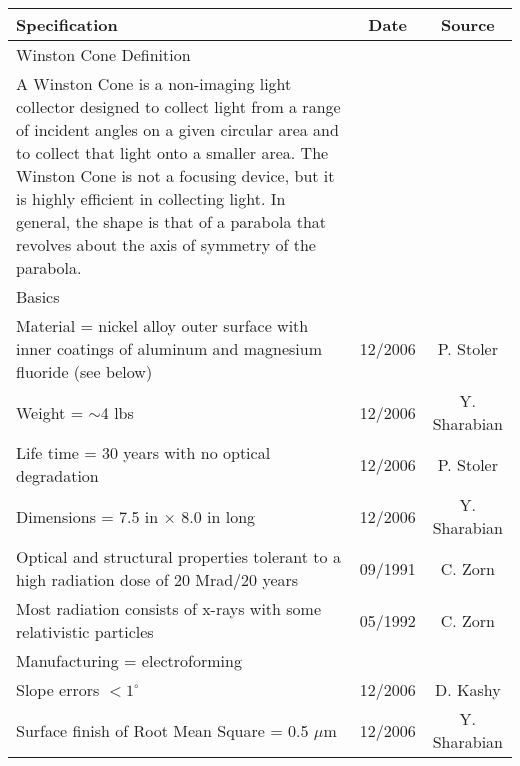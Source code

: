 \begin{table}
\begin{center}
\begin{tabular}{|l|c|c|} \hline
Specification             & Date              & Source    \\ \hline
Winston Cone Definition   &                   &           \\ \hline
\begin{minipage}[l]{0.68\textwidth} A Winston Cone is a non-imaging 
light collector designed to collect light from a range of incident 
angles on a given circular area and to collect that light onto a 
smaller area.  The Winston Cone is not a focusing device, but it is 
highly efficient in collecting light.  In general, the shape is 
that of a parabola that revolves about the axis of symmetry of the 
parabola.\end{minipage}   &                   &           \\ \hline
Basics                    &                   &           \\ \hline
\begin{minipage}[l]{0.68\textwidth}
Material = nickel alloy outer surface with inner coatings of aluminum and magnesium fluoride (see below)
\end{minipage}            & 12/2006           & P. Stoler \\ \hline
Weight = $\sim$4 lbs      & 12/2006           & Y. Sharabian \\ \hline
Life time = 30 years with no optical degradation & 12/2006  & P. Stoler\\ \hline
Dimensions  = 7.5 in $\times$ 8.0 in long     & 12/2006 & Y. Sharabian\\ \hline
\begin{minipage}[l]{0.68\textwidth}
Optical and structural properties tolerant to a high radiation dose 
of 20 Mrad/20 years
\end{minipage}            & 09/1991           & C. Zorn    \\ \hline
Most radiation consists of x-rays with some relativistic particles & 05/1992 & C. Zorn\\ \hline
Manufacturing = electroforming          &                   &            \\ \hline
Slope errors $<1^\circ$   & 12/2006           & D. Kashy   \\ \hline
Surface finish of Root Mean Square = 0.5 $\mu$m & 12/2006 & Y. Sharabian\\ \hline

\end{tabular}
\end{center}
\end{table}
